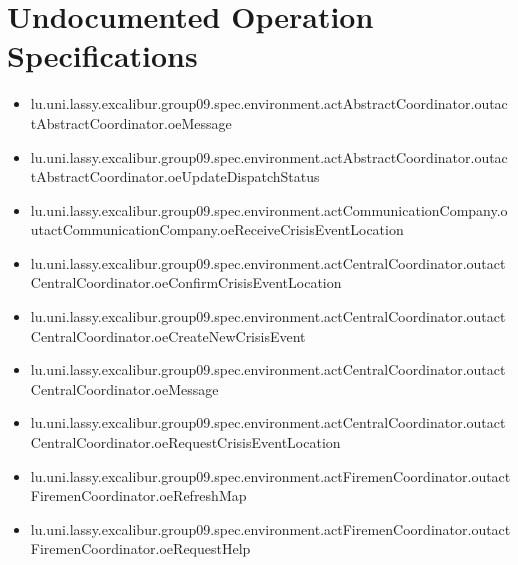\section[Undocumented Operation Specifications]{Undocumented Operation Specifications}
\begin{itemize}
\item lu.uni.lassy.excalibur.group09.spec.environment.actAbstractCoordinator.outactAbstractCoordinator.oeMessage 
\item lu.uni.lassy.excalibur.group09.spec.environment.actAbstractCoordinator.outactAbstractCoordinator.oeUpdateDispatchStatus 
\item lu.uni.lassy.excalibur.group09.spec.environment.actCommunicationCompany.outactCommunicationCompany.oeReceiveCrisisEventLocation 
\item lu.uni.lassy.excalibur.group09.spec.environment.actCentralCoordinator.outactCentralCoordinator.oeConfirmCrisisEventLocation 
\item lu.uni.lassy.excalibur.group09.spec.environment.actCentralCoordinator.outactCentralCoordinator.oeCreateNewCrisisEvent 
\item lu.uni.lassy.excalibur.group09.spec.environment.actCentralCoordinator.outactCentralCoordinator.oeMessage 
\item lu.uni.lassy.excalibur.group09.spec.environment.actCentralCoordinator.outactCentralCoordinator.oeRequestCrisisEventLocation 
\item lu.uni.lassy.excalibur.group09.spec.environment.actFiremenCoordinator.outactFiremenCoordinator.oeRefreshMap 
\item lu.uni.lassy.excalibur.group09.spec.environment.actFiremenCoordinator.outactFiremenCoordinator.oeRequestHelp 
\end{itemize}








